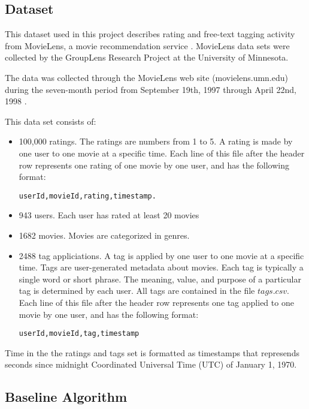 \subsection{Dataset}
\label{sec:dataset}

This dataset used in this project describes rating and free-text tagging activity from MovieLens, a movie recommendation service \cite{movielensdata}.
MovieLens data sets were collected by the GroupLens Research Project at the University of Minnesota.

The data was collected through the MovieLens web site (movielens.umn.edu) during the seven-month period from September 19th, 1997 through April 22nd, 1998 \cite{movielens}.
 
This data set consists of:
\begin{itemize}
\item 100,000 ratings. The ratings are numbers from 1 to 5. A rating is made by one user to one movie at a specific time. Each line of this file after the header row represents one rating of one movie by one user, and has the following format:
\begin{verbatim}
userId,movieId,rating,timestamp.
\end{verbatim}
\item 943 users. Each user has rated at least 20 movies
\item 1682 movies. Movies are categorized in genres. 
\item 2488 tag appliciations. A tag is applied by one user to one movie at a specific time. Tags are user-generated metadata about movies. Each tag is typically a single word or short phrase. The meaning, value, and purpose of a particular tag is determined by each user. All tags are contained in the file $tags.csv$. Each line of this file after the header row represents one tag applied to one movie by one user, and has the following format:
\begin{verbatim}
userId,movieId,tag,timestamp
\end{verbatim}
\end{itemize}

Time in the the ratings and tags set is formatted as timestamps that represends seconds since midnight Coordinated Universal Time (UTC) of January 1, 1970.

\subsection{Baseline Algorithm}
\label{sec:baselinealgorithm}

